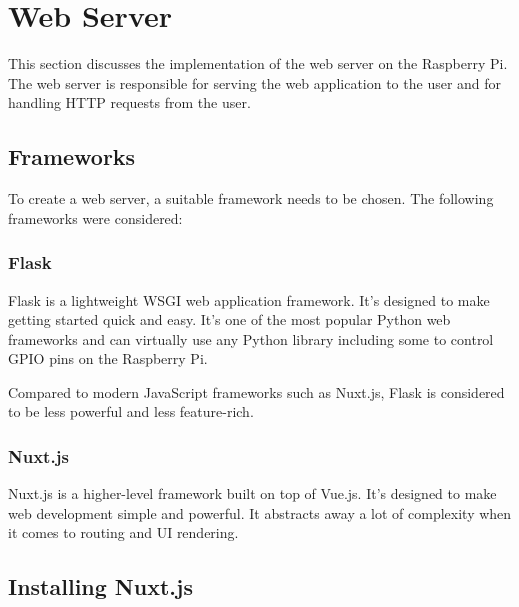 \section{Web Server} \label{sec:webServer}
This section discusses the implementation of the web server
on the Raspberry Pi. The web server is responsible for
serving the web application to the user and for handling
HTTP requests from the user.

        \subsection{Frameworks}
        To create a web server, a suitable framework needs
        to be chosen. The following frameworks were considered:

            \subsubsection{Flask}
            Flask is a lightweight WSGI web application framework.
            It's designed to make getting started quick and easy. 
            It's one of the most popular Python web frameworks and
            can virtually use any Python library including some
            to control GPIO pins on the Raspberry Pi.

            Compared to modern JavaScript frameworks such as Nuxt.js, 
            Flask is considered to be less powerful and less 
            feature-rich.

            \subsubsection{Nuxt.js}
            Nuxt.js is a higher-level framework built on top of Vue.js.
            It's designed to make web development simple and powerful.
            It abstracts away a lot of complexity when it comes to 
            routing and UI rendering.
            
        \subsection{Installing Nuxt.js}